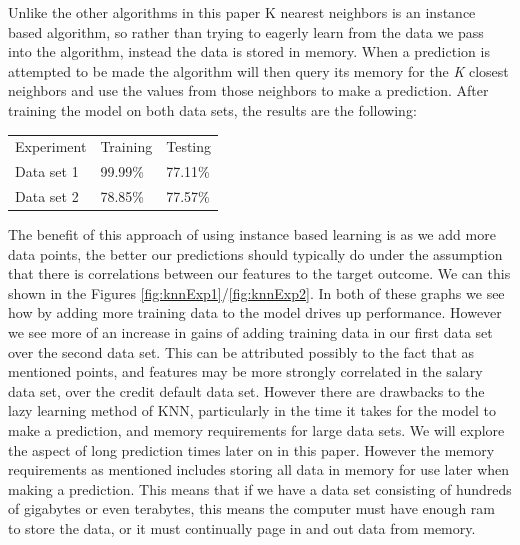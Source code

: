 \documentclass[
	letterpaper, %
]{IEEEtran}
\begin{document}
		Unlike the other algorithms in this paper K nearest neighbors is an instance based algorithm, so rather than trying to eagerly learn from the data we pass into the algorithm, instead the data is stored in memory. When a prediction is attempted to be made the algorithm will then query its memory for the \emph{K} closest neighbors and use the values from those neighbors to make a prediction. After training the model on both data sets, the results are the following:
		\begin{center}
			\begin{table}[h]
				\begin{tabular}{lll}
					Experiment & Training & Testing \\
					Data set 1 & 99.99\% & 77.11\% \\
					Data set 2 & 78.85\% & 77.57\%
				\end{tabular}
			\end{table}
		\end{center}
		The benefit of this approach of using instance based learning is as we add more data points, the better our predictions should typically do under the assumption that there is correlations between our features to the target outcome. We can this shown in the Figures \ref{fig:knnExp1}/\ref{fig:knnExp2}. In both of these graphs we see how by adding more training data to the model drives up performance. However we see more of an increase in gains of adding training data in our first data set over the second data set. This can be attributed possibly to the fact that as mentioned points, and features may be more strongly correlated in the salary data set, over the credit default data set. However there are drawbacks to the lazy learning method of KNN, particularly in the time it takes for the model to make a prediction, and memory requirements for large data sets. We will explore the aspect of long prediction times later on in this paper. However the memory requirements as mentioned includes storing all data in memory for use later when making a prediction. This means that if we have a data set consisting of hundreds of gigabytes or even terabytes, this means the computer must have enough ram to store the data, or it must continually page in and out data from memory.
	
\end{document}
